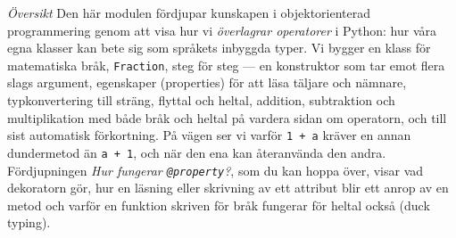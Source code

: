 \emph{Översikt}
Den här modulen fördjupar kunskapen i objektorienterad programmering
genom att visa hur vi \emph{överlagrar operatorer} i Python: hur våra
egna klasser kan bete sig som språkets inbyggda typer.  Vi bygger en
klass för matematiska bråk, \texttt{Fraction}, steg för
steg --- en konstruktor som tar emot flera slags argument, egenskaper
(\foreignlanguage{english}{properties}) för att läsa täljare och
nämnare, typkonvertering till sträng, flyttal och heltal, addition,
subtraktion och multiplikation med både bråk och heltal på vardera sidan
om operatorn, och till sist automatisk förkortning.  På vägen ser vi
varför \texttt{1 + a} kräver en annan dundermetod än
\texttt{a + 1}, och när den ena kan återanvända den andra.
Fördjupningen \emph{Hur fungerar \texttt{@property}?}, som du kan hoppa
över, visar vad dekoratorn gör, hur en läsning eller skrivning av ett
attribut blir ett anrop av en metod och varför en funktion skriven för
bråk fungerar för heltal också (\foreignlanguage{english}{duck typing}).

